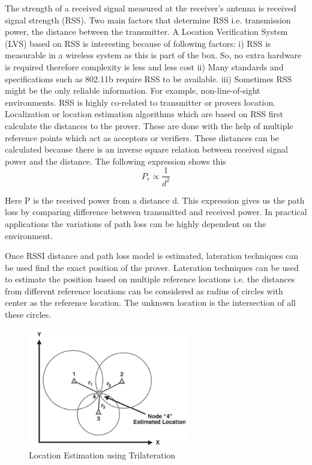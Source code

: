 The strength of a received signal measured at the receiver's antenna is received signal strength (RSS). Two main factors that determine RSS i.e. transmission power, the distance between the transmitter. 
A Location Verification System (LVS) based on RSS is interesting because of following factors\cite{yan14}: i) RSS is measurable in a wireless system as this is part of the box. So, no extra hardware is required therefore complexity is less and less cost ii) Many standards and specifications such as 802.11b require RSS to be available. iii) Sometimes RSS might be the only reliable information. For example, non-line-of-sight environments. RSS is highly co-related to transmitter or provers location. Localization or location estimation algorithms which are based on RSS first calculate the distances to the prover. These are done with the help of multiple reference points which act as acceptors or verifiers. These distances can be calculated because there is an inverse square relation between received signal power and the distance. The following expression shows this\cite{pu11}
\begin{equation}
    P_r \propto \frac{1}{d^2}
    \label{gm_delay}
\end{equation}

Here P is the received power from a distance d. This expression gives us the path loss by comparing difference between transmitted and received power. In practical applications the variations of path loss can be highly dependent on the environment.

Once RSSI distance and path loss model is estimated, lateration techniques can be used find the exact position of the prover. Lateration techniques can be used to estimate the position based on multiple reference locations i.e. the distances from different reference locations can be considered as radius of circles with center as the reference location. The unknown location is the intersection of all these circles.

\begin{figure}[htp]
    \centering
    \includegraphics[width=7cm]{strength_trilat_pic.png}
    \caption{Location Estimation using Trilateration \cite{pu11}}
    \label{fig:strength_trilat_pic}
\end{figure}


